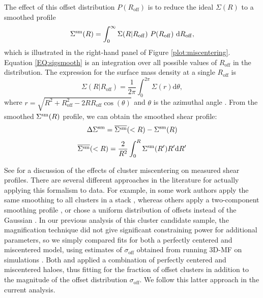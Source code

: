 The effect of this offset distribution $P(R_{\mathrm{off}})$ is to reduce the ideal $\Sigma(R)$ to a smoothed profile \citep[see e.g.][]{Johnston07,George12}
\begin{equation}
\label{EQ:sigsmooth}
\Sigma^{\rm sm}(R)=\int_{0}^{\infty} \Sigma(R|R_{\mathrm{off}})\ P(R_{\mathrm{off}})\ \mathrm{d}R_{\mathrm{off}},
\end{equation}
which is illustrated in the right-hand panel of Figure \ref{plot:miscentering}. Equation \ref{EQ:sigsmooth} is an integration over all possible values of $R_{\mathrm{off}}$ in the distribution. The expression for the surface mass density at a single $R_{\mathrm{off}}$ is
\begin{equation}
\Sigma(R|R_{\mathrm{off}})=\frac{1}{2\pi}\int_{0}^{2\pi}\Sigma(r) \mathrm{d}\theta,
\end{equation}
where $r = \sqrt{R^2+R_{\mathrm{off}}^2-2RR_{\mathrm{off}}\cos(\theta)}$ and $\theta$ is the azimuthal angle \citep{Yang06}. From the smoothed $\Sigma^{\rm sm}(R)$ profile, we can obtain the smoothed shear profile:
\begin{equation}
\Delta\Sigma^{\rm sm} = \overline{\Sigma^{\rm sm}}(<R) - \Sigma^{\rm sm}(R)
\end{equation}
\begin{equation}
\overline{\Sigma^{\rm sm}}(<R) = \frac{2}{R^2} \int_{0}^{R} \Sigma^{\rm sm}(R')R'\mathrm{d}R'
\end{equation}

See \citet{George12} for a discussion of the effects of cluster miscentering on measured shear profiles. There are several different approaches in the literature for actually applying this formalism to data. For example, in some work authors apply the same smoothing to all clusters in a stack \citep{George12}, whereas others apply a two-component smoothing profile \citep{Oguri14}, or chose a uniform distribution of offsets instead of the Gaussian \citep{Sehgal13}. In our previous analysis of this cluster candidate sample, the magnification technique did not give significant constraining power for additional parameters, so we simply compared fits for both a perfectly centered and miscentered model, using estimates of $\sigma_{\mathrm{off}}$ obtained from running \ac{3D-MF} on simulations \citep{Ford14}. Both \citet{Johnston07} and \citet{Covone14} applied a combination of perfectly centered and miscentered haloes, thus fitting for the fraction of offset clusters in addition to the magnitude of the offset distribution $\sigma_{\mathrm{off}}$. We follow this latter approach in the current analysis.

